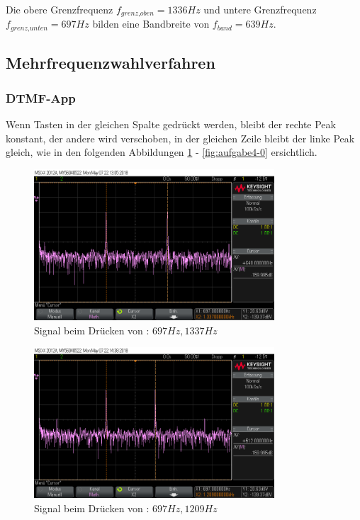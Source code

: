 \documentclass[a4paper]{article}
\begin{document}
Die obere Grenzfrequenz $f_\textit{grenz,oben}=1336\si{Hz}$ und untere Grenzfrequenz $f_\textit{grenz,unten}=697\si{Hz}$ bilden eine Bandbreite von $f_\textit{band}=639\si{Hz}$.

\subsection{Mehrfrequenzwahlverfahren}
\subsubsection{DTMF-App}

Wenn Tasten in der gleichen Spalte gedrückt werden, bleibt der rechte Peak konstant, der andere wird verschoben, in der gleichen Zeile bleibt der linke Peak gleich, wie in den folgenden Abbildungen \ref{fig:aufgabe4-2} - \ref{fig:aufgabe4-0} ersichtlich.

\begin{figure}[H]
    \centering
    \includegraphics[width=0.8\textwidth]{aufgabe4_2.png}
    \caption{Signal beim Drücken von \grqq: $697\si{Hz}, 1337\si{Hz}$}
    \label{fig:aufgabe4-2}
\end{figure}

\begin{figure}[H]
    \centering
    \includegraphics[width=0.8\textwidth]{aufgabe4_1.png}
    \caption{Signal beim Drücken von \grqq: $697\si{Hz}, 1209\si{Hz}$}
    \label{fig:aufgabe4-1}
\end{figure}
\end{document}
